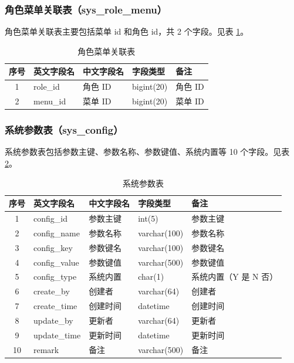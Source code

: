 \documentclass{izdthesis}
\begin{document}
\subsubsection{角色菜单关联表（sys\_role\_menu）}
角色菜单关联表主要包括菜单 id 和角色 id，共 2 个字段。见表 \ref{tab4-5}。

\begin{table}[H]
  \centering
  \caption{角色菜单关联表}
  \label{tab4-5}
  \songti
  \begin{tabular}{c l l l l}
    \toprule
    序号 & 英文字段名 & 中文字段名 & 字段类型 & 备注 \\
    \midrule
    1 & role\_id & 角色 ID & bigint(20) & 角色 ID \\
    2 & menu\_id & 菜单 ID & bigint(20) & 菜单 ID \\
    \bottomrule
  \end{tabular}
\end{table}

\subsubsection{系统参数表（sys\_config）}
系统参数表包括参数主键、参数名称、参数键值、系统内置等 10 个字段。见表 \ref{tab4-6}。

\begin{table}[H]
  \centering
  \caption{系统参数表}
  \label{tab4-6}
  \songti
  \begin{tabular}{c l l l p{4cm}}
    \toprule
    序号 & 英文字段名 & 中文字段名 & 字段类型 & 备注 \\
    \midrule
    1 & config\_id & 参数主键 & int(5) & 参数主键 \\
    2 & config\_name & 参数名称 & varchar(100) & 参数名称 \\
    3 & config\_key & 参数键名 & varchar(100) & 参数键名 \\
    4 & config\_value & 参数键值 & varchar(500) & 参数键值 \\
    5 & config\_type & 系统内置 & char(1) & 系统内置（Y 是 N 否） \\
    6 & create\_by & 创建者 & varchar(64) & 创建者 \\
    7 & create\_time & 创建时间 & datetime & 创建时间 \\
    8 & update\_by & 更新者 & varchar(64) & 更新者 \\
    9 & update\_time & 更新时间 & datetime & 更新时间 \\
    10 & remark & 备注 & varchar(500) & 备注 \\
    \bottomrule
  \end{tabular}
\end{table}
\end{document}
